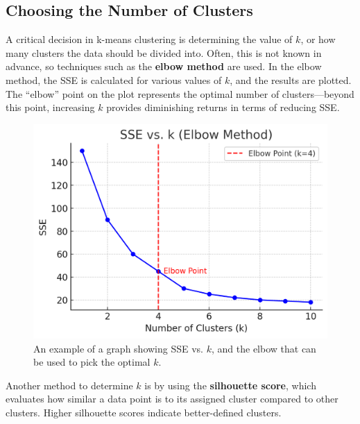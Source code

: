 \subsection{Choosing the Number of Clusters}
\begin{flushleft}
    \large A critical decision in k-means clustering is determining the value of \( k \), or how many clusters the data should be divided into. Often, this is not known in advance, so techniques such as the \textbf{elbow method} are used. In the elbow method, the SSE is calculated for various values of \( k \), and the results are plotted. The ``elbow'' point on the plot represents the optimal number of clusters—beyond this point, increasing \( k \) provides diminishing returns in terms of reducing SSE. \break

    \begin{figure}[H]
        \centering
        \includegraphics[width=0.45\linewidth]{ml/SSEkElbowmethod.png}
        \caption{An example of a graph showing SSE vs. $k$, and the elbow that can be used to pick the optimal $k$.}
        \label{fig:SSEkElbowmethod}
    \end{figure}

    Another method to determine \( k \) is by using the \textbf{silhouette score}, which evaluates how similar a data point is to its assigned cluster compared to other clusters. Higher silhouette scores indicate better-defined clusters.
\end{flushleft}

